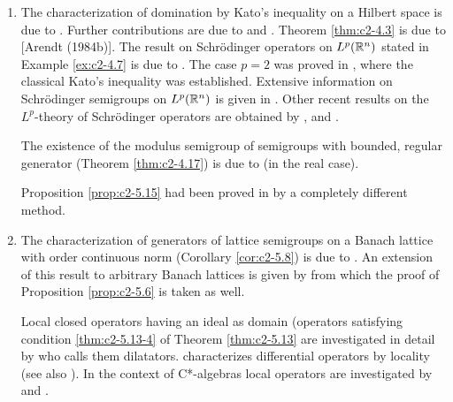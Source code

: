 \begin{enumerate}[label=\emph{Section \arabic*:}, wide]
\item  The characterization of domination by Kato's inequality on a Hilbert space is due to \citet{simon:1977}. Further contributions are due to \citet{hessetal:1977} and \citet{kishimotorobinson:1980}. Theorem \ref{thm:c2-4.3} is due to [Arendt (1984b)]. The result on Schrödinger operators on $L^p(\mathbb{R}^n)$ stated in Example \ref{ex:c2-4.7} is due to \citet{kato:1986}. The case $p = 2$ was proved in \citet{kato:1973}, where the classical Kato's inequality was established. Extensive information on Schrödinger semigroups on $L^p(\mathbb{R}^n)$ is given in \citet{simon:1982}. Other recent results on the $L^p$-theory of Schrödinger operators are obtained by \citet{davies:1986}, \citet{okazawa:1984} and \citet{voigt:1984a}.

The existence of the modulus semigroup of semigroups with bounded, regular generator (Theorem \ref{thm:c2-4.17}) is due to \citet{derndinger:1984} (in the real case).

Proposition \ref{prop:c2-5.15}   had been proved in \citet{schaeferetal:1978} by a completely different method.
 
\item  
The characterization of generators of lattice semigroups on a Banach lattice with order continuous norm (Corollary  \ref{cor:c2-5.8}) is due to \citet{nageluhlig:1981}. An extension of this result to arbitrary Banach lattices is given by \citet{arendt:1982} from which the proof of  Proposition  \ref{prop:c2-5.6}   is taken as well.

Local closed operators having an ideal as domain (\ie operators satisfying condition \ref{thm:c2-5.13-4} of Theorem \ref{thm:c2-5.13}  are investigated in detail by \citet{nakano:1950} who calls them dilatators. \citet{peetre:1959} characterizes differential operators by locality (see also \citet{luxemburg:1979}). In the context of C*-algebras local operators are investigated by \citet{batty:1985} and \citet{battyrobinson:1985}.

\end{enumerate}

\RaggedRight


